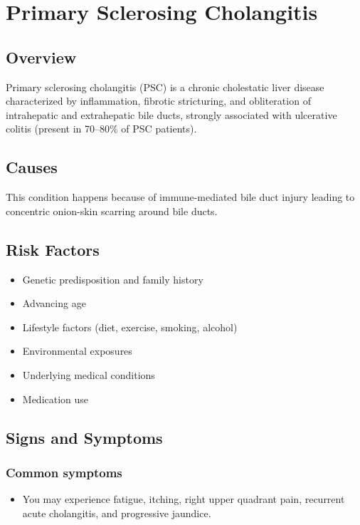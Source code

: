 \chapter{Primary Sclerosing Cholangitis}
\label{sec:Primary Sclerosing Cholangitis}

\section{Overview}
Primary sclerosing cholangitis (PSC) is a chronic cholestatic liver disease characterized by inflammation, fibrotic stricturing, and obliteration of intrahepatic and extrahepatic bile ducts, strongly associated with ulcerative colitis (present in 70--80\% of PSC patients).
\section{Causes}
This condition happens because of immune-mediated bile duct injury leading to concentric onion-skin scarring around bile ducts.     
\section{Risk Factors}

\begin{itemize}[noitemsep]
  \item Genetic predisposition and family history
  \item Advancing age
  \item Lifestyle factors (diet, exercise, smoking, alcohol)
  \item Environmental exposures
  \item Underlying medical conditions
  \item Medication use
\end{itemize}
\section{Signs and Symptoms}

\subsection{Common symptoms}
\begin{itemize}[noitemsep]
  \item You may experience fatigue, itching, right upper quadrant pain, recurrent acute cholangitis, and progressive jaundice. 
  \end{itemize}

